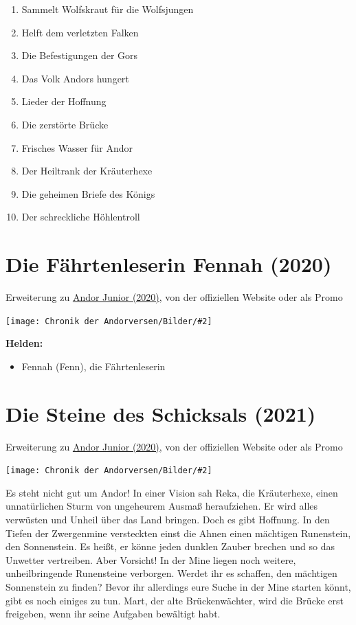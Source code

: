 \documentclass[10pt, a4paper, oneside]{book}
\newcommand{\fillbreak}{\vspace*{\fill}\columnbreak}
\newcommand{\produkt}[1]{%
    \section{#1}%
    \label{Produkt: #1}%
}
\newcommand{\refprodukt}[1]{\hyperref[Produkt: #1]{#1}}
\newcommand{\bildmitts}[2][height=0.32\textwidth,width=0.48\textwidth,keepaspectratio]{%
    \begin{center}
        \texttt{[image: Chronik der Andorversen/Bilder/\#2]}
    \end{center}
}
\begin{document}
\begin{multicols}{2}
\begin{enumerate}[topsep=0pt,itemsep=-1ex,partopsep=1ex,parsep=1ex]
    \setcounter{enumi}{0}
    \item Sammelt Wolfskraut für die Wolfsjungen
    \item Helft dem verletzten Falken
    \item Die Befestigungen der Gors
    \item Das Volk Andors hungert
    \item Lieder der Hoffnung
    \item Die zerstörte Brücke
    \item Frisches Wasser für Andor
    \item Der Heiltrank der Kräuterhexe
    \item Die geheimen Briefe des Königs
    \item Der schreckliche Höhlentroll
\end{enumerate}



\fillbreak
\produkt{Die Fährtenleserin Fennah (2020)}

\begin{center}
    Erweiterung zu \refprodukt{Andor Junior (2020)}, von der offiziellen Website oder als Promo
\end{center}

\bildmitts{Andor Junior Fennah.jpeg}

\textbf{Helden:} 
\begin{itemize}[topsep=0pt,itemsep=-1ex,partopsep=1ex,parsep=1ex]
    \item Fennah (Fenn), die Fährtenleserin 
\end{itemize}



\produkt{Die Steine des Schicksals (2021)}

\begin{center}
    Erweiterung zu \refprodukt{Andor Junior (2020)}, von der offiziellen Website oder als Promo
\end{center}

\bildmitts{Die Steine des Schicksals Promo (2024).jpg}

Es steht nicht gut um Andor! In einer Vision sah Reka, die Kräuterhexe, einen unnatürlichen Sturm von ungeheurem Ausmaß heraufziehen. Er wird alles verwüsten und Unheil über das Land bringen. Doch es gibt Hoffnung. In den Tiefen der Zwergenmine versteckten einst die Ahnen einen mächtigen Runenstein, den Sonnenstein. Es heißt, er könne jeden dunklen Zauber brechen und so das Unwetter vertreiben. Aber Vorsicht! In der Mine liegen noch weitere, unheilbringende Runensteine verborgen. Werdet ihr es schaffen, den mächtigen Sonnenstein zu finden? Bevor ihr allerdings eure Suche in der Mine starten könnt, gibt es noch einiges zu tun. Mart, der alte Brückenwächter, wird die Brücke erst freigeben, wenn ihr seine Aufgaben bewältigt habt.



\end{multicols}
\end{document}
